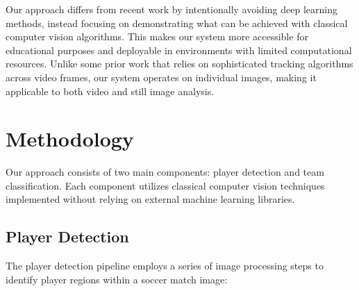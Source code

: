 \documentclass[10pt,twocolumn,letterpaper]{article}
\begin{document}
Our approach differs from recent work by intentionally avoiding deep learning methods, instead focusing on demonstrating what can be achieved with classical computer vision algorithms. This makes our system more accessible for educational purposes and deployable in environments with limited computational resources. Unlike some prior work that relies on sophisticated tracking algorithms across video frames, our system operates on individual images, making it applicable to both video and still image analysis.

\section{Methodology}
\label{sec:method}

Our approach consists of two main components: player detection and team classification. Each component utilizes classical computer vision techniques implemented without relying on external machine learning libraries.

\subsection{Player Detection}

The player detection pipeline employs a series of image processing steps to identify player regions within a soccer match image:
\end{document}
